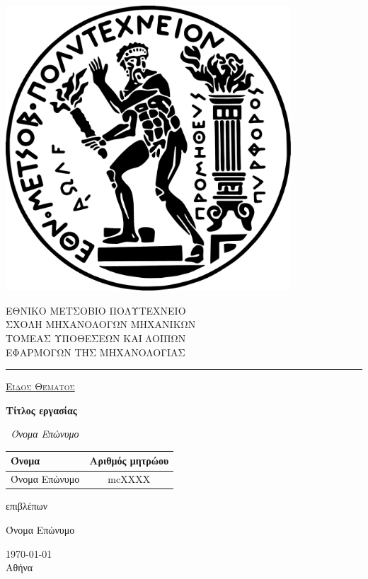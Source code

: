 \begin{titlepage}
	\begin{center}
		\begin{minipage}{0.15\textwidth}%
			\includegraphics[width=0.8\textwidth]{./logo/pyro.pdf}
		\end{minipage}\hspace{10pt}
		\begin{minipage}{0.6\textwidth}%
			ΕΘΝΙΚΟ ΜΕΤΣΟΒΙΟ ΠΟΛΥΤΕΧΝΕΙΟ\\
			ΣΧΟΛΗ ΜΗΧΑΝΟΛΟΓΩΝ ΜΗΧΑΝΙΚΩΝ\\
			ΤΟΜΕΑΣ ΥΠΟΘΕΣΕΩΝ ΚΑΙ ΛΟΙΠΩΝ\\
			ΕΦΑΡΜΟΓΩΝ ΤΗΣ ΜΗΧΑΝΟΛΟΓΙΑΣ\\
		\end{minipage}%
	\end{center}

	\par\noindent\rule{\textwidth}{0.8pt}

	\vspace{1cm}
	{\centering

		{\scshape\Large \underline{Είδος Θέματος}\par}
		\vspace{1.5cm}
		{\huge\bfseries Τίτλος εργασίας\par}
		\vspace{2cm}
		{\Large\itshape~Όνομα Επώνυμο\/\par}

		\begin{table}[ht]
			\centering
			\begin{tabular}[H]{lc}
				\toprule
				Όνομα         & Αριθμός μητρώου \\ \midrule \midrule
				Όνομα Επώνυμο & mcΧΧΧΧ          \\
				\bottomrule
			\end{tabular}
		\end{table}

		\vfill
		επιβλέπων\par
		Όνομα Επώνυμο

		\vfill

		\begin{center}
			{\large \today\\ Αθήνα}
		\end{center}
	}
\end{titlepage}

